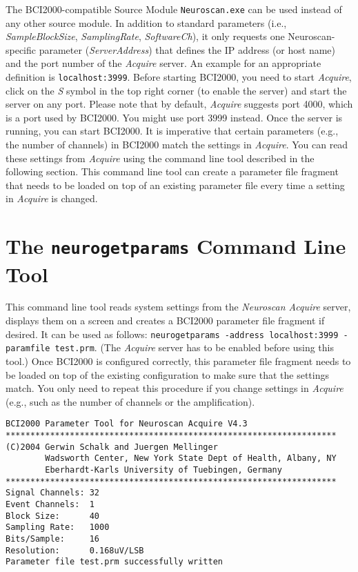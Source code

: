 \documentclass[letterpaper, oneside, 12pt]{article}
\newcommand{\ie}{i.e.,}
\newcommand{\eg}{e.g.,}
\begin{document}
The BCI2000-compatible Source Module \texttt{Neuroscan.exe} can be used instead 
of any other source module. In addition to standard parameters (\ie{} 
\emph{SampleBlockSize}, \emph{SamplingRate}, \emph{SoftwareCh}), it only 
requests one Neuroscan-specific parameter (\emph{ServerAddress}) that defines 
the IP address (or host name) and the port number of the \emph{Acquire} server. 
An example for an appropriate definition is \texttt{localhost:3999}. Before 
starting BCI2000, you need to start \emph{Acquire}, click on the \emph{S} symbol 
in the top right corner (to enable the server) and start the server on any port. 
Please note that by default, \emph{Acquire} suggests port 4000, which is a port 
used by BCI2000. You might use port 3999 instead. Once the server is running, 
you can start BCI2000. It is imperative that certain parameters (\eg{} the 
number of channels) in BCI2000 match the settings in \emph{Acquire}. You can 
read these settings from \emph{Acquire} using the command line tool described in 
the following section. This command line tool can create a parameter file 
fragment that needs to be loaded on top of an existing parameter file every time 
a setting in \emph{Acquire} is changed.

\section{The \texttt{neurogetparams} Command Line Tool}

This command line tool reads system settings from the \emph{Neuroscan Acquire} 
server, displays them on a screen and creates a BCI2000 parameter file fragment 
if desired. It can be used as follows: \texttt{neurogetparams -address 
localhost:3999 -paramfile test.prm}. (The \emph{Acquire} server has to be 
enabled before using this tool.) Once BCI2000 is configured correctly, this 
parameter file fragment needs to be loaded on top of the existing configuration 
to make sure that the settings match. You only need to repeat this procedure if 
you change settings in \emph{Acquire} (\eg{} such as the number of channels or 
the amplification).

\begin{verbatim}
BCI2000 Parameter Tool for Neuroscan Acquire V4.3
*******************************************************************
(C)2004 Gerwin Schalk and Juergen Mellinger
        Wadsworth Center, New York State Dept of Health, Albany, NY
        Eberhardt-Karls University of Tuebingen, Germany
*******************************************************************
Signal Channels: 32
Event Channels:  1
Block Size:      40
Sampling Rate:   1000
Bits/Sample:     16
Resolution:      0.168uV/LSB
Parameter file test.prm successfully written
\end{verbatim}
\end{document}

